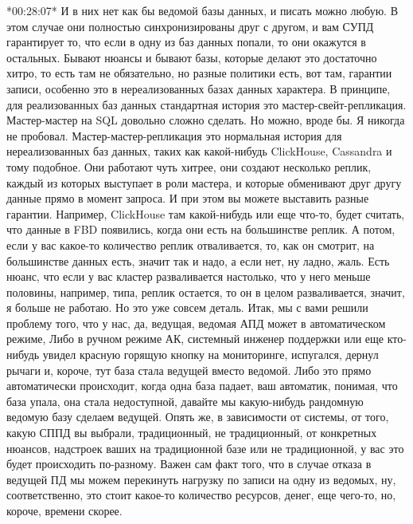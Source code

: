 \documentclass[12pt]{article} %
\begin{document}
*00:28:07*
И в них нет как бы ведомой базы данных, и писать можно любую.  В этом случае они полностью синхронизированы друг с другом, и вам СУПД гарантирует то, что если в одну из баз данных попали, то они окажутся в остальных.  Бывают нюансы и бывают базы, которые делают это достаточно хитро, то есть там не обязательно, но разные политики есть, вот там, гарантии записи, особенно это в нереализованных базах данных характера.  В принципе, для реализованных баз данных стандартная история это мастер-свейт-репликация.  Мастер-мастер на SQL довольно сложно сделать.  Но можно, вроде бы. Я никогда не пробовал.  Мастер-мастер-репликация это нормальная история для нереализованных баз данных, таких как какой-нибудь ClickHouse, Cassandra и тому подобное.  Они работают чуть хитрее, они создают несколько реплик, каждый из которых выступает в роли мастера, и которые обменивают друг другу данные прямо в момент запроса.  И при этом вы можете выставить разные гарантии.  Например, ClickHouse там какой-нибудь или еще что-то, будет считать, что данные в FBD появились, когда они есть на большинстве реплик.  А потом, если у вас какое-то количество реплик отваливается, то, как он смотрит, на большинстве данных есть, значит так и надо, а если нет, ну ладно, жаль.  Есть нюанс, что если у вас кластер разваливается настолько, что у него меньше половины, например, типа, реплик остается, то он в целом разваливается, значит, я больше не работаю.  Но это уже совсем деталь.  Итак, мы с вами решили проблему того, что у нас, да, ведущая, ведомая АПД может в автоматическом режиме, Либо в ручном режиме АК, системный инженер поддержки или еще кто-нибудь увидел красную горящую кнопку на мониторинге, испугался, дернул рычаги и, короче, тут база стала ведущей вместо ведомой.  Либо это прямо автоматически происходит, когда одна база падает, ваш автоматик, понимая, что база упала, она стала недоступной, давайте мы какую-нибудь рандомную ведомую базу сделаем ведущей.  Опять же, в зависимости от системы, от того, какую СППД вы выбрали, традиционный, не традиционный, от конкретных нюансов, надстроек ваших на традиционной базе или не традиционной, у вас это будет происходить по-разному.  Важен сам факт того, что в случае отказа в ведущей ПД мы можем перекинуть нагрузку по записи на одну из ведомых, ну, соответственно, это стоит какое-то количество ресурсов, денег, еще чего-то, но, короче, времени скорее.
\end{document}
